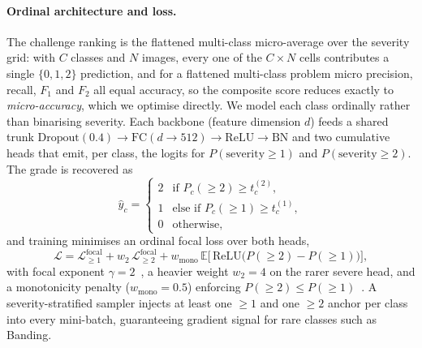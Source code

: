 \documentclass[runningheads]{llncs}
\begin{document}
\paragraph{Ordinal architecture and loss.}
The challenge ranking is the flattened multi-class micro-average over the
severity grid: with $C$ classes and $N$ images, every one of the $C\times N$
cells contributes a single $\{0,1,2\}$ prediction, and for a flattened
multi-class problem micro precision, recall, $F_1$ and $F_2$ all equal accuracy,
so the composite score reduces exactly to \emph{micro-accuracy}, which we
optimise directly. We model each class ordinally rather than binarising severity.
Each backbone (feature dimension $d$) feeds a shared trunk
$\text{Dropout}(0.4)\!\to\!\mathrm{FC}(d\!\to\!512)\!\to\!\mathrm{ReLU}
\!\to\!\mathrm{BN}$ and two cumulative heads that emit, per class, the logits for
$P(\text{severity}\ge 1)$ and $P(\text{severity}\ge 2)$. The grade is recovered as
\[
  \hat{y}_c =
  \begin{cases}
    2 & \text{if } P_c(\ge 2)\ge t^{(2)}_c,\\
    1 & \text{else if } P_c(\ge 1)\ge t^{(1)}_c,\\
    0 & \text{otherwise,}
  \end{cases}
\]
and training minimises an ordinal focal loss over both heads,
\[
  \mathcal{L} = \mathcal{L}^{\mathrm{focal}}_{\ge 1}
              + w_2\,\mathcal{L}^{\mathrm{focal}}_{\ge 2}
              + w_{\mathrm{mono}}\,
                \mathbb{E}\big[\,\mathrm{ReLU}\!\big(P(\ge 2)-P(\ge 1)\big)\big],
\]
with focal exponent $\gamma=2$~\cite{lin2017focal}, a heavier weight $w_2=4$ on
the rarer severe head, and a monotonicity penalty ($w_{\mathrm{mono}}=0.5$)
enforcing $P(\ge 2)\le P(\ge 1)$~\cite{frank2001simple}. A severity-stratified
sampler injects at least one $\ge 1$ and one $\ge 2$ anchor per class into every
mini-batch, guaranteeing gradient signal for rare classes such as Banding.
\end{document}
